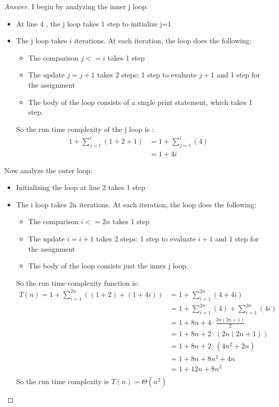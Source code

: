 \documentclass[11pt]{article}
\theoremstyle{definition}
\theoremstyle{definition}
\theoremstyle{definition}
\begin{document}
\begin{proof}[Answer]

I begin by analyzing the inner j loop:
\begin{itemize}
\item At line 4 , the j loop takes 1 step to initialize j=1
\item The j loop takes $i$ iterations. At each iteration, the loop does the following:
	\begin{itemize}
	\item The comparison $j<=i$ takes 1 step
	\item The update $j=j+1$ takes 2 steps:  1 step to evaluate $j+1$ and 1 step for the assignment 
	\item The body of the loop consists of a single print statement, which takes 1 step. 
	\end{itemize}
So the run time complexity of the j loop is :
\begin{align*} 
1+ \sum_{j=1}^{i} (1+2+1)  &= 1+ \sum_{j=1}^{i} (4) \\
&= 1+ 4i
\end{align*}
\end{itemize}

Now analyze the outer loop:
\begin{itemize}
\item Initializing the loop at line 2 takes 1 step
\item The i loop takes 2n iterations. At each iteration, the loop does the following:
	\begin{itemize}
	\item The comparison $i<=2n$ takes 1 step
	\item The update $i=i+1$ takes 2 steps:  1 step to evaluate $i+1$ and 1 step for the assignment 
	\item The body of the loop consists just the inner j loop. 
	\end{itemize}
So the run time complexity function is:
\begin{align*} 
T(n)= 1+ \sum_{i=1}^{2n} ((1+2) +(1+4i)) &= 1+ \sum_{i=1}^{2n} (4+4i) \\
&= 1+ \sum_{i=1}^{2n} (4) + \sum_{i=1}^{2n} (4i) \\
&= 1+ 8n + 4\cdot \frac{2n(2n+1)}{2} \\
&= 1+ 8n + 2\cdot (2n(2n+1)) \\
&= 1+ 8n + 2\cdot (4n^2+2n) \\
&= 1+ 8n + 8n^2+4n \\
&= 1+ 12n + 8n^2 \\
\end{align*}
So the run time complexity is $T(n) = \Theta(n^2)$
\end{itemize}
\end{proof}



\end{document}
